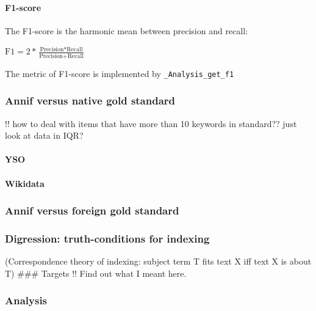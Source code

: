 \hypertarget{f1-score}{%
\paragraph{F1-score}\label{f1-score}}

The F1-score is the harmonic mean between precision and recall:

\(\text{F1} = \displaystyle 2 * \frac{\text{Precision} * \text{Recall}}{\text{Precision} + \text{Recall}}\)

The metric of F1-score is implemented by \texttt{\_Analysis\_get\_f1}

\hypertarget{annif-versus-native-gold-standard}{%
\subsubsection{Annif versus native gold
standard}\label{annif-versus-native-gold-standard}}

!! how to deal with items that have more than 10 keywords in standard??
just look at data in IQR?

\hypertarget{yso}{%
\paragraph{YSO}\label{yso}}

\hypertarget{wikidata}{%
\paragraph{Wikidata}\label{wikidata}}

\hypertarget{annif-versus-foreign-gold-standard}{%
\subsubsection{Annif versus foreign gold
standard}\label{annif-versus-foreign-gold-standard}}

\hypertarget{digression-truth-conditions-for-indexing}{%
\subsubsection{Digression: truth-conditions for
indexing}\label{digression-truth-conditions-for-indexing}}

(Correspondence theory of indexing: subject term T fits text X iff text
X is about T) \#\#\# Targets !! Find out what I meant here.

\hypertarget{analysis-2}{%
\subsubsection{Analysis}\label{analysis-2}}

